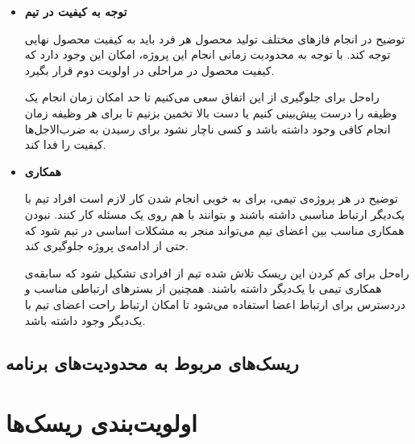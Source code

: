 \begin{itemize}
	
	\item 
	\textbf{توجه به کیفیت در تیم}

	توضیح \hspace*{1cm} 
در انجام فازهای مختلف تولید محصول هر فرد باید به کیفیت محصول نهایی توجه کند. با توجه به محدودیت زمانی انجام این پروژه، امکان این وجود دارد که کیفیت محصول در مراحلی در اولویت دوم قرار بگیرد.
	
	راه‌حل \hspace*{1cm} 
برای جلوگیری از این اتفاق سعی می‌کنیم تا حد امکان زمان انجام یک وظیفه را درست پیش‌بینی کنیم یا دست بالا تخمین بزنیم تا برای هر وظیفه زمان انجام کافی وجود داشته باشد و کسی ناچار نشود برای رسیدن به ضرب‌الاجل‌ها کیفیت را فدا کند.


\item 
\textbf{همکاری}

توضیح \hspace*{1cm} 
در هر پروژه‌ی تیمی، برای به خوبی انجام شدن کار لازم است افراد تیم با یک‌دیگر ارتباط مناسبی داشته باشند و بتوانند با هم روی یک مسئله کار کنند. نبودن همکاری مناسب بین اعضای تیم می‌تواند منجر به مشکلات اساسی در تیم شود که حتی از ادامه‌ی پروژه جلوگیری کند.

راه‌حل \hspace*{1cm} 
برای کم کردن این ریسک تلاش شده تیم از افرادی تشکیل شود که سابقه‌ی همکاری تیمی با یک‌دیگر داشته باشند. همچنین از بسترهای ارتباطی مناسب و دردسترس برای ارتباط اعضا استفاده می‌شود تا امکان ارتباط راحت اعضای تیم با یک‌دیگر وجود داشته باشد.

	
\end{itemize}

\subsection{ریسک‌های مربوط به محدودیت‌های برنامه}


\section{اولویت‌بندی ریسک‌ها}

